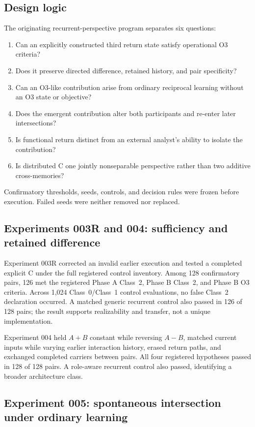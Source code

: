 \documentclass[11pt,a4paper]{article}
\begin{document}
\subsection{Design logic}

The originating recurrent-perspective program separates six questions:
\begin{enumerate}
  \item Can an explicitly constructed third return state satisfy operational O3 criteria?
  \item Does it preserve directed difference, retained history, and pair specificity?
  \item Can an O3-like contribution arise from ordinary reciprocal learning without an O3 state or objective?
  \item Does the emergent contribution alter both participants and re-enter later intersections?
  \item Is functional return distinct from an external analyst's ability to isolate the contribution?
  \item Is distributed C one jointly nonseparable perspective rather than two additive cross-memories?
\end{enumerate}
Confirmatory thresholds, seeds, controls, and decision rules were frozen before execution. Failed seeds were neither removed nor replaced.

\subsection{Experiments 003R and 004: sufficiency and retained difference}

Experiment 003R corrected an invalid earlier execution and tested a completed explicit C under the full registered control inventory. Among 128 confirmatory pairs, 126 met the registered Phase A Class~2, Phase B Class~2, and Phase B O3 criteria. Across 1,024 Class~0/Class~1 control evaluations, no false Class~2 declaration occurred. A matched generic recurrent control also passed in 126 of 128 pairs; the result supports realizability and transfer, not a unique implementation.

Experiment 004 held $A+B$ constant while reversing $A-B$, matched current inputs while varying earlier interaction history, erased return paths, and exchanged completed carriers between pairs. All four registered hypotheses passed in 128 of 128 pairs. A role-aware recurrent control also passed, identifying a broader architecture class.

\subsection{Experiment 005: spontaneous intersection under ordinary learning}
\end{document}
